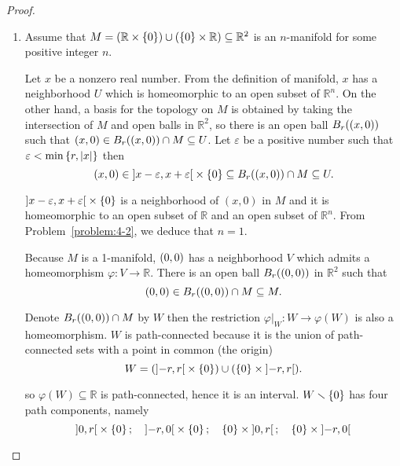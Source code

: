 \begin{proof}
	\begin{enumerate}[label={(\alph*)}]
		\item Assume that $M = (\mathbb{R}\times\left\{{0}\right\}) \cup (\left\{{0}\right\}\times\mathbb{R}) \subseteq \mathbb{R}^{2}$ is an $n$-manifold for some positive integer $n$.

		      Let $x$ be a nonzero real number. From the definition of manifold, $x$ has a neighborhood $U$ which is homeomorphic to an open subset of $\mathbb{R}^{n}$. On the other hand, a basis for the topology on $M$ is obtained by taking the intersection of $M$ and open balls in $\mathbb{R}^{2}$, so there is an open ball $B_{r}(\left({x,0}\right))$ such that $\left({x,0}\right) \in B_{r}(\left({x,0}\right)) \cap M \subseteq U$. Let $\varepsilon$ be a positive number such that $\varepsilon < \min\left\{{r, \left\vert{x}\right\vert}\right\}$ then
		      \begin{equation*}
			      \left({x, 0}\right) \in \left]{x - \varepsilon, x + \varepsilon}\right[ \times \left\{{0}\right\} \subseteq B_{r}(\left({x,0}\right)) \cap M \subseteq U.
		      \end{equation*}

		      $\left]{x - \varepsilon, x + \varepsilon}\right[ \times \left\{{0}\right\}$ is a neighborhood of $(x, 0)$ in $M$ and it is homeomorphic to an open subset of $\mathbb{R}$ and an open subset of $\mathbb{R}^{n}$. From Problem~\ref{problem:4-2}, we deduce that $n = 1$.

		      Because $M$ is a 1-manifold, $\left({0,0}\right)$ has a neighborhood $V$ which admits a homeomorphism $\varphi: V \to \mathbb{R}$. There is an open ball $B_{r}(\left({0,0}\right))$ in $\mathbb{R}^{2}$ such that
		      \begin{equation*}
			      \left({0, 0}\right) \in B_{r}(\left({0, 0}\right)) \cap M \subseteq M.
		      \end{equation*}

		      Denote $B_{r}(\left({0, 0}\right)) \cap M$ by $W$ then the restriction $\varphi\vert_{W}: W \to \varphi(W)$ is also a homeomorphism. $W$ is path-connected because it is the union of path-connected sets with a point in common (the origin)
		      \begin{equation*}
			      W = (\left]{-r, r}\right[ \times\left\{{0}\right\}) \cup (\left\{{0}\right\} \times \left]{-r, r}\right[).
		      \end{equation*}

		      so $\varphi(W) \subseteq \mathbb{R}$ is path-connected, hence it is an interval. $W\smallsetminus\left\{{0}\right\}$ has four path components, namely
		      \begin{equation*}
			      \left]{0, r}\right[\times\left\{{0}\right\};\quad \left]{-r, 0}\right[\times\left\{{0}\right\};\quad \left\{{0}\right\}\times\left]{0, r}\right[;\quad \left\{{0}\right\}\times\left]{-r, 0}\right[
		      \end{equation*}


\end{enumerate}
\end{proof}
